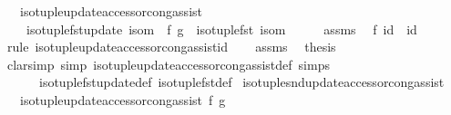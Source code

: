 \begin{isabellebody}
\ \ \ {\isachardoublequoteopen}iso{\isacharunderscore}{\kern0pt}tuple{\isacharunderscore}{\kern0pt}update{\isacharunderscore}{\kern0pt}accessor{\isacharunderscore}{\kern0pt}cong{\isacharunderscore}{\kern0pt}assist\isanewline
\ \ \ \ {\isacharparenleft}{\kern0pt}iso{\isacharunderscore}{\kern0pt}tuple{\isacharunderscore}{\kern0pt}fst{\isacharunderscore}{\kern0pt}update\ isom\ {\isasymcirc}\ f{\isacharparenright}{\kern0pt}\ {\isacharparenleft}{\kern0pt}g\ {\isasymcirc}\ iso{\isacharunderscore}{\kern0pt}tuple{\isacharunderscore}{\kern0pt}fst\ isom{\isacharparenright}{\kern0pt}{\isachardoublequoteclose}\isanewline
%
\isadelimproof
%
\endisadelimproof
%
\isatagproof
{}\isamarkupfalse%
\ {\isacharminus}{\kern0pt}\isanewline
\ \ \isamarkupfalse%
\ assms\ \isamarkupfalse%
\ {\isachardoublequoteopen}f\ id\ {\isacharequal}{\kern0pt}\ id{\isachardoublequoteclose}\isanewline
\ \ \ \ \isamarkupfalse%
\ {\isacharparenleft}{\kern0pt}rule\ iso{\isacharunderscore}{\kern0pt}tuple{\isacharunderscore}{\kern0pt}update{\isacharunderscore}{\kern0pt}accessor{\isacharunderscore}{\kern0pt}cong{\isacharunderscore}{\kern0pt}assist{\isacharunderscore}{\kern0pt}id{\isacharparenright}{\kern0pt}\isanewline
\ \ \isamarkupfalse%
\ assms\ \isamarkupfalse%
\ {\isacharquery}{\kern0pt}thesis\isanewline
\ \ \ \ \isamarkupfalse%
\ {\isacharparenleft}{\kern0pt}clarsimp\ simp{\isacharcolon}{\kern0pt}\ iso{\isacharunderscore}{\kern0pt}tuple{\isacharunderscore}{\kern0pt}update{\isacharunderscore}{\kern0pt}accessor{\isacharunderscore}{\kern0pt}cong{\isacharunderscore}{\kern0pt}assist{\isacharunderscore}{\kern0pt}def\ simps\isanewline
\ \ \ \ \ \ iso{\isacharunderscore}{\kern0pt}tuple{\isacharunderscore}{\kern0pt}fst{\isacharunderscore}{\kern0pt}update{\isacharunderscore}{\kern0pt}def\ iso{\isacharunderscore}{\kern0pt}tuple{\isacharunderscore}{\kern0pt}fst{\isacharunderscore}{\kern0pt}def{\isacharparenright}{\kern0pt}\isanewline
{}\isamarkupfalse%
%
\endisatagproof
{\isafoldproof}%
%
\isadelimproof
\isanewline
%
\endisadelimproof
\isanewline
{}\isamarkupfalse%
\ iso{\isacharunderscore}{\kern0pt}tuple{\isacharunderscore}{\kern0pt}snd{\isacharunderscore}{\kern0pt}update{\isacharunderscore}{\kern0pt}accessor{\isacharunderscore}{\kern0pt}cong{\isacharunderscore}{\kern0pt}assist{\isacharcolon}{\kern0pt}\isanewline
\ \ \ {\isachardoublequoteopen}iso{\isacharunderscore}{\kern0pt}tuple{\isacharunderscore}{\kern0pt}update{\isacharunderscore}{\kern0pt}accessor{\isacharunderscore}{\kern0pt}cong{\isacharunderscore}{\kern0pt}assist\ f\ g{\isachardoublequoteclose}\isanewline

\end{isabellebody}
